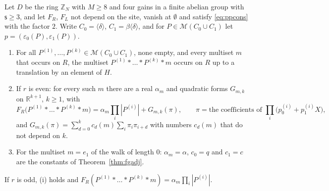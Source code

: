 \begin{theorem}\label{thm:fgprod}
Let $D$ be the ring $\mathbb{Z}_N$ with $M\ge8$ and four gains in a finite abelian group with $\mathsf{s}\ge3$, and let $F_R$, $F_L$ not depend on the site, vanish at $\emptyset$ and satisfy \eqref{eq:ppcons} with the factor $2$. Write $C_0=\langle\delta\rangle$, $C_1=\beta\langle\delta\rangle$, and for $P\in\mathcal{M}(C_0\cup C_1)$ let $p=(\varepsilon_0(P),\varepsilon_1(P))$.
\begin{enumerate}[label=(\roman*)]
\item For all $P^{(1)},\dots,P^{(k)}\in\mathcal{M}(C_0\cup C_1)$, none empty, and every multiset $m$ that occurs on $R$, the multiset $P^{(1)}*\dots*P^{(k)}*m$ occurs on $R$ up to a translation by an element of $H$.
\item If $r$ is even: for every such $m$ there are a real $\alpha_m$ and quadratic forms $G_{m,k}$ on $\mathbb{R}^{k+1}$, $k\ge1$, with
\[
F_R\bigl(P^{(1)}*\dots*P^{(k)}*m\bigr)=\alpha_m\prod_i|P^{(i)}|+G_{m,k}(\pi),\qquad \pi=\text{the coefficients of }\prod_i\bigl(p^{(i)}_0+p^{(i)}_1X\bigr),
\]
and $G_{m,k}(\pi)=\sum_{d=0}^{k}c_d(m)\sum_{i}\pi_i\pi_{i+d}$ with numbers $c_d(m)$ that do not depend on $k$.
\item For the multiset $m=e_1$ of the walk of length $0$: $\alpha_m=\alpha$, $c_0=q$ and $c_1=c$ are the constants of Theorem~\ref{thm:fgadj}.
\end{enumerate}
If $r$ is odd, (i) holds and $F_R(P^{(1)}*\dots*P^{(k)}*m)=\alpha_m\prod_i|P^{(i)}|$.
\end{theorem}
